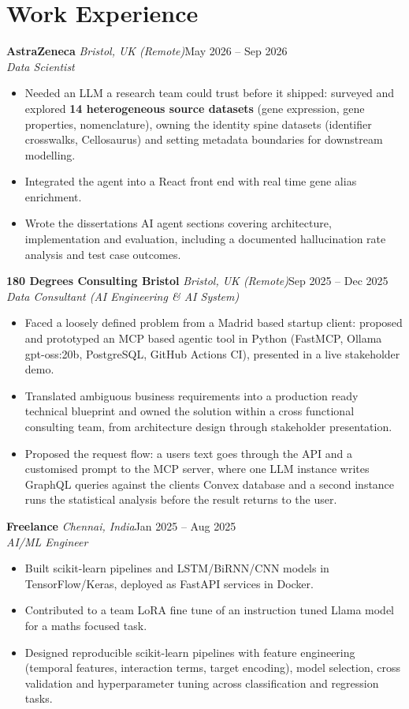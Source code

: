 \documentclass[a4paper,11pt]{article}
\newcommand{\role}[4]{%
  \textbf{#1}{\color{muted}\,\textperiodcentered\,\textit{#2}}\hfill{\color{muted}#3}\\
  \textit{#4}\par}
\newcommand{\gap}{\vspace{5pt}}
\newcommand{\num}[1]{\textbf{#1}}   %
\begin{document}
\section{Work Experience}
\role{AstraZeneca}{Bristol, UK (Remote)}{May 2026 – Sep 2026}{Data Scientist}
\begin{itemize}
  \item Needed an LLM a research team could trust before it shipped: surveyed and explored \num{14 heterogeneous source datasets} (gene expression, gene properties, nomenclature), owning the identity spine datasets (identifier crosswalks, Cellosaurus) and setting metadata boundaries for downstream modelling.
  \item Integrated the agent into a React front end with real time gene alias enrichment.
  \item Wrote the dissertation\textquotesingle{}s AI agent sections covering architecture, implementation and evaluation, including a documented hallucination rate analysis and test case outcomes.
\end{itemize}
\gap
{}
\role{180 Degrees Consulting Bristol}{Bristol, UK (Remote)}{Sep 2025 – Dec 2025}{Data Consultant (AI Engineering \& AI System)}
\begin{itemize}
  \item Faced a loosely defined problem from a Madrid based startup client: proposed and prototyped an MCP based agentic tool in Python (FastMCP, Ollama gpt-oss:20b, PostgreSQL, GitHub Actions CI), presented in a live stakeholder demo.
  \item Translated ambiguous business requirements into a production ready technical blueprint and owned the solution within a cross functional consulting team, from architecture design through stakeholder presentation.
  \item Proposed the request flow: a user\textquotesingle{}s text goes through the API and a customised prompt to the MCP server, where one LLM instance writes GraphQL queries against the client\textquotesingle{}s Convex database and a second instance runs the statistical analysis before the result returns to the user.
\end{itemize}
\gap
{}
\role{Freelance}{Chennai, India}{Jan 2025 – Aug 2025}{AI/ML Engineer}
\begin{itemize}
  \item Built scikit-learn pipelines and LSTM/BiRNN/CNN models in TensorFlow/Keras, deployed as FastAPI services in Docker.
  \item Contributed to a team LoRA fine tune of an instruction tuned Llama model for a maths focused task.
  \item Designed reproducible scikit-learn pipelines with feature engineering (temporal features, interaction terms, target encoding), model selection, cross validation and hyperparameter tuning across classification and regression tasks.
\end{itemize}
\end{document}
